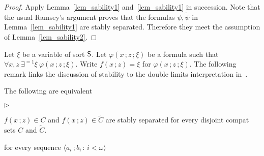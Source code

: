 \documentclass{amsproc}
\newcommand{\mylabel}[1]{{#1}\hfill}
\renewenvironment{itemize}
  {\begin{list}{$\triangleright$}{%
  \setlength{\parskip}{0mm}
  \setlength{\topsep}{.4\baselineskip}
  \setlength{\rightmargin}{0mm}
  \setlength{\listparindent}{0mm}
  \setlength{\itemindent}{0mm}
  \setlength{\labelwidth}{3ex}
  \setlength{\itemsep}{.2\baselineskip}
  \setlength{\parsep}{.2\baselineskip}
  \setlength{\partopsep}{0mm}
  \setlength{\labelsep}{1ex}
  \setlength{\leftmargin}{\labelwidth+\labelsep}
  \let\makelabel\mylabel}}{%
\end{list}}
\begin{document}
{\begin{theorem}
  
\end{theorem}

\begin{proof}
  Apply Lemma~\ref{lem_sability1} and~\ref{lem_sability1} in succession.
  Note that the usual Ramsey's argument proves that the formulas $\psi,\tilde\psi$ in Lemma~\ref{lem_sability1} are stably separated.
  Therefore they meet the assumption of Lemma~\ref{lem_sability2}.
\end{proof}

Let $\xi$ be a variable of sort ${\sf S}$.
Let $\varphi(x\,;z\,;\xi)$ be a formula such that $\forall x,z\ \exists^{=1}\xi\ \varphi(x\,;z\,;\xi)$.
Write $f(x\,;z)=\xi$ for $\varphi(x\,;z\,;\xi)$.
The following remark links the discussion of stability to the double limits interpretation in~\cite{BY}.

\begin{remark}
  The following are equivalent 
  \begin{itemize}
    \item[1.] $f(x\,;z)\in C$ and $f(x\,;z)\in\tilde C$ are stably separated for every disjoint compat sets $C$ and $\tilde C$.
    \item[2.] for every sequence $\langle a_i\,;b_i\,:\,i<\omega\rangle$ 
    
  \end{itemize}
\end{remark}
\newcommand\biburl[1]{\url{#1}}

\begin{bibdiv}
\begin{biblist}[]\normalsize



\end{biblist}
\end{bibdiv}}
\end{document}
